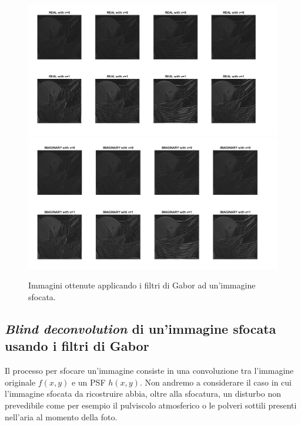 \documentclass[final]{siamltex}
\begin{document}
\begin{figure}[h!]
\begin{center}
\includegraphics[width=0.9\columnwidth]{gaborfiltrate.png}
\includegraphics[width=0.9\columnwidth]{gaborfiltrate1.png}
\caption{Immagini ottenute applicando i filtri di Gabor ad un'immagine sfocata.}
\label{gaborfiltrate}
\end{center}
\end{figure}

\newpage
\subsection{\textit{Blind deconvolution} di un'immagine sfocata usando i filtri di Gabor} \label{sec8}
%
Il processo per sfocare un'immagine consiste in una convoluzione tra l'immagine originale $f\left(x,y\right)$ e un PSF $h(x,y)$. Non andremo a considerare il caso in cui l'immagine sfocata da ricostruire abbia, oltre alla sfocatura, un disturbo non prevedibile come per esempio il pulviscolo atmosferico o le polveri sottili presenti nell'aria al momento della foto. 
\end{document}
